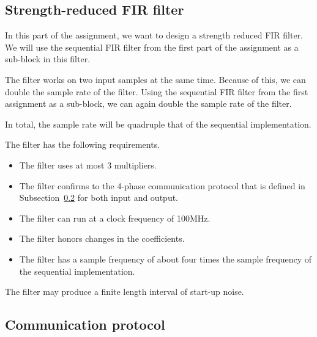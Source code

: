 \subsection{Strength-reduced FIR filter}
In this part of the assignment, we want to design a strength reduced FIR filter.
We will use the sequential FIR filter from the first part of the assignment as a sub-block in this filter.

The filter works on two input samples at the same time.
Because of this, we can double the sample rate of the filter.
Using the sequential FIR filter from the first assignment as a sub-block, we can again double the sample rate of the filter.

In total, the sample rate will be quadruple that of the sequential implementation.

The filter has the following requirements.

\begin{itemize}
	\item The filter uses at most 3 multipliers.
	\item The filter confirms to the 4-phase communication protocol that is defined in Subsection~\ref{sec:analysis:communication} for both input and output.
	\item The filter can run at a clock frequency of 100MHz.
	\item The filter honors changes in the coefficients.
	\item The filter has a sample frequency of about four times the sample frequency of the sequential implementation.
\end{itemize}

The filter may produce a finite length interval of start-up noise.

\subsection{Communication protocol}
\label{sec:analysis:communication}
